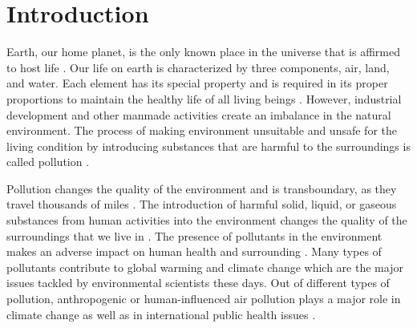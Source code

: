 \chapter{Introduction}
\setcounter{page}{1}




Earth, our home planet, is the only known place in the universe that is affirmed to host life  \cite{daly2007introduction}. Our life on earth is characterized by three components, air, land, and water. Each element has its special property and is required in its proper proportions to maintain the healthy life of all living beings \cite{daly2007introduction}. %
However, industrial development and other manmade activities create an imbalance in the natural environment. The process of making environment unsuitable and unsafe for the living condition by introducing substances that are harmful to the surroundings is called pollution \cite{manisalidis2020environmental}. 
\par
 Pollution changes the quality of the environment and is transboundary, as they travel thousands of miles \cite{daly2007introduction}. The introduction of harmful solid, liquid, or gaseous substances from human activities into the environment changes the quality of the surroundings that we live in \cite{manisalidis2020environmental}. The presence of pollutants in the environment makes an adverse impact on human health and surrounding \cite{bernes1998persistent}  \cite{ritter1995persistent}. Many types of pollutants contribute to global warming and climate change which are the major issues tackled by environmental scientists these days. Out of different types of pollution, anthropogenic or human-influenced air pollution plays a major role in climate change as well as in international public health issues \cite{manisalidis2020environmental}.
 

  

